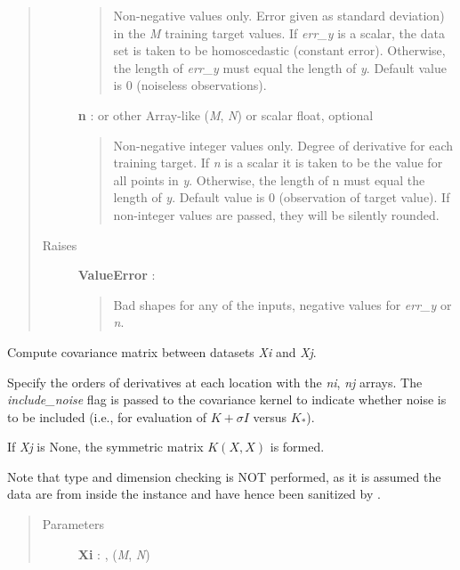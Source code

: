 \documentclass[letterpaper,10pt,english]{sphinxmanual}
\begin{document}
\begin{fulllineitems}
\begin{fulllineitems}
\begin{quote}
\begin{description}
\begin{quote}
Non-negative values only. Error given as standard deviation) in the
\emph{M} training target values. If \emph{err\_y} is a scalar, the data set is
taken to be homoscedastic (constant error). Otherwise, the length
of \emph{err\_y} must equal the length of \emph{y}. Default value is 0
(noiseless observations).
\end{quote}

\textbf{n} :  or other Array-like (\emph{M}, \emph{N}) or scalar float, optional
\begin{quote}

Non-negative integer values only. Degree of derivative for each
training target. If \emph{n} is a scalar it is taken to be the value for
all points in \emph{y}. Otherwise, the length of n must equal the length
of \emph{y}. Default value is 0 (observation of target value). If
non-integer values are passed, they will be silently rounded.
\end{quote}

\item[{Raises }] \leavevmode
\textbf{ValueError} :
\begin{quote}

Bad shapes for any of the inputs, negative values for \emph{err\_y} or \emph{n}.
\end{quote}

\end{description}\end{quote}

\end{fulllineitems}


\begin{fulllineitems}
\label{gptools:gptools.gaussian_process.GaussianProcess.compute_Kij}
Compute covariance matrix between datasets \emph{Xi} and \emph{Xj}.

Specify the orders of derivatives at each location with the \emph{ni}, \emph{nj}
arrays. The \emph{include\_noise} flag is passed to the covariance kernel to
indicate whether noise is to be included (i.e., for evaluation of
$K+\sigma I$ versus $K_*$).

If \emph{Xj} is None, the symmetric matrix $K(X, X)$ is formed.

Note that type and dimension checking is NOT performed, as it is assumed
the data are from inside the instance and have hence been sanitized by
{\hyperref[gptools:gptools.gaussian_process.GaussianProcess.add_data]{}}.
\begin{quote}\begin{description}
\item[{Parameters }] \leavevmode
\textbf{Xi} : , (\emph{M}, \emph{N})
\begin{quote}


\end{quote}
\end{description}
\end{quote}
\end{fulllineitems}
\end{fulllineitems}
\end{document}

